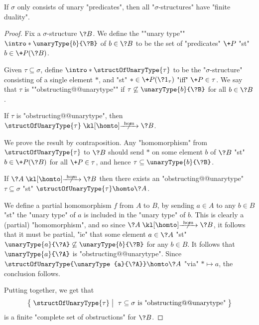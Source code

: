 \begin{property}
	\AP\label{prop:finite-duality-unary-predicates}
	If $\sigma$ only consists of unary "predicates", then all "$\sigma$-structures"
	have "finite duality".
\end{property}	

\begin{proof}
	Fix a $\sigma$-structure $\?B$. We define the \AP""unary type""
	$\intro*\unaryType{b}{\?B}$ of $b \in \?B$
	to be the set of "predicates" $\+P$ "st" $b \in \+P(\?B)$.
	
	Given $\tau \subseteq \sigma$, define \AP$\intro*\structOfUnaryType{\tau}$
	to be the "$\sigma$-structure"
	consisting of a single element $*$, and "st" $* \in \+P(\?1_\tau)$ "iff"
	$\+P \in \tau$.
	We say that $\tau$ is \AP""obstructing@@unarytype"" if
	$\tau \not\subseteq \unaryType{b}{\?B}$ for all $b \in \?B$.

	\begin{claim}
		\AP\label{claim:finite-duality-unary-predicates-direct}
		If $\tau$ is "obstructing@@unarytype",
		then $\structOfUnaryType{\tau} \nothomto \?B$.
	\end{claim}
	We prove the result by contraposition.
	Any "homomorphism" from $\structOfUnaryType{\tau}$ to $\?B$
	should send $*$ on some element $b$ of $\?B$
	"st" $b \in \+P(\?B)$ for all $\+P \in \tau$, and
	hence $\tau \subseteq \unaryType{b}{\?B}$.

	\begin{claim}
		\AP\label{claim:finite-duality-unary-predicates-converse}
		If $\?A \nothomto \?B$ then there exists an "obstructing@@unarytype"
		$\tau \subseteq \sigma$ "st" $\structOfUnaryType{\tau} \homto \?A$.
	\end{claim}
	We define a partial homomorphism $f$ from $A$ to $B$,
	by sending $a \in A$ to any $b \in B$ "st" the "unary type" of $a$
	is included in the "unary type" of $b$. This is clearly a (partial) "homomorphism",
	and so since $\?A \nothomto \?B$, it follows that it must be partial,
	"ie" that some element $a \in \?A$ "st" $\unaryType{a}{\?A} \not\subseteq
	\unaryType{b}{\?B}$ for any $b \in B$. It follows that $\unaryType{a}{\?A}$
	is "obstructing@@unarytype". Since $\structOfUnaryType{\unaryType{a}{\?A}} \homto \?A$
	"via" $* \mapsto a$, the conclusion follows.

	Putting  together, we get that
	\[
		\big\{\;
			\structOfUnaryType{\tau}
			\;\big\vert\;
			\text{ $\tau \subseteq \sigma$ is "obstructing@@unarytype"} 
		\;\big\}
	\]
	is a finite "complete set of obstructions" for $\?B$.
\end{proof}

